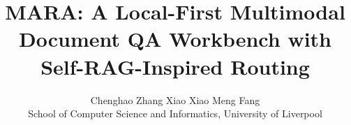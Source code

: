 \documentclass[11pt]{article}
\author{
Chenghao Zhang \quad Xiao Xiao \quad Meng Fang\\
School of Computer Science and Informatics, University of Liverpool \\
}
\title{MARA: A Local-First Multimodal Document QA Workbench with Self-RAG-Inspired Routing}
\begin{document}
\maketitle



\raggedbottom


\appendix

\end{document}

